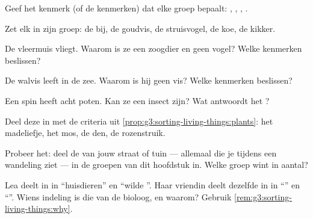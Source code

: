 \begin{exercise}[$\star$]\label{exo:g3:sorting-living-things:2}
Geef het kenmerk (of de kenmerken) dat elke groep bepaalt: ,
, , .
\end{exercise}

\begin{exercise}[$\star$]\label{exo:g3:sorting-living-things:3}
Zet elk  in zijn groep: de bij, de goudvis, de struisvogel, de koe,
de kikker.
\end{exercise}

\begin{exercise}[$\star$]\label{exo:g3:sorting-living-things:4}
De vleermuis vliegt. Waarom is ze een zoogdier en geen vogel? Welke
kenmerken beslissen?
\end{exercise}

\begin{exercise}[$\star$]\label{exo:g3:sorting-living-things:5}
De walvis leeft in de zee. Waarom is hij geen vis? Welke kenmerken
beslissen?
\end{exercise}

\begin{exercise}[$\star$]\label{exo:g3:sorting-living-things:6}
Een spin heeft acht poten. Kan ze een insect zijn? Wat antwoordt het
?
\end{exercise}

\begin{exercise}[$\star$]\label{exo:g3:sorting-living-things:7}
Deel deze  in met de criteria uit
\cref{prop:g3:sorting-living-things:plants}: het madeliefje, het mos,
de den, de rozenstruik.
\end{exercise}

\begin{exercise}[$\star$]\label{exo:g3:sorting-living-things:8}
Probeer het: deel de  van jouw straat of tuin --- allemaal die je
tijdens een wandeling ziet --- in de groepen van dit hoofdstuk in.
Welke groep wint in aantal?
\end{exercise}

\begin{exercise}[$\star\star$]\label{exo:g3:sorting-living-things:9}
Lea deelt  in in ``huisdieren'' en ``wilde ''. Haar vriendin
deelt dezelfde  in in ``'' en ``''. Wiens
indeling is die van de bioloog, en waarom? Gebruik
\cref{rem:g3:sorting-living-things:why}.
\end{exercise}

